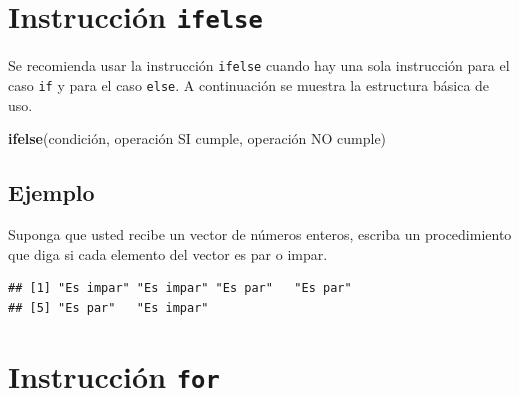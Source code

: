 \documentclass[10pt,]{krantz}
\makeatletter
\newenvironment{Shaded}{\begin{snugshade}}{\end{snugshade}}
\newcommand{\KeywordTok}[1]{\textcolor[rgb]{0.13,0.29,0.53}{\textbf{#1}}}
\newcommand{\DecValTok}[1]{\textcolor[rgb]{0.00,0.00,0.81}{#1}}
\newcommand{\StringTok}[1]{\textcolor[rgb]{0.31,0.60,0.02}{#1}}
\newcommand{\OperatorTok}[1]{\textcolor[rgb]{0.81,0.36,0.00}{\textbf{#1}}}
\newcommand{\NormalTok}[1]{#1}
\newenvironment{kframe}{%
\medskip{}
\setlength{\fboxsep}{.8em}
 \def\at@end@of@kframe{}%
 \ifinner\ifhmode%
  \def\at@end@of@kframe{\end{minipage}}%
  \begin{minipage}{\columnwidth}%
 \fi\fi%
 \def\FrameCommand##1{\hskip\@totalleftmargin \hskip-\fboxsep
 \colorbox{shadecolor}{##1}\hskip-\fboxsep
     \hskip-\linewidth \hskip-\@totalleftmargin \hskip\columnwidth}%
 \MakeFramed {\advance\hsize-\width
   \@totalleftmargin\z@ \linewidth\hsize
   \@setminipage}}%
 {\par\unskip\endMakeFramed%
 \at@end@of@kframe}
\renewenvironment{Shaded}{\begin{kframe}}{\end{kframe}}
\makeatother
\begin{document}
\section{\texorpdfstring{Instrucción \texttt{ifelse}
}{Instrucción ifelse }}\label{instruccion-ifelse}

Se recomienda usar la instrucción \texttt{ifelse} cuando hay una sola
instrucción para el caso \texttt{if} y para el caso \texttt{else}. A
continuación se muestra la estructura básica de uso.

\begin{Shaded}
\begin{Highlighting}[]
\KeywordTok{ifelse}\NormalTok{(condición, operación SI cumple, operación NO cumple)}
\end{Highlighting}
\end{Shaded}

\subsection*{Ejemplo}\label{ejemplo-16}


Suponga que usted recibe un vector de números enteros, escriba un
procedimiento que diga si cada elemento del vector es par o impar.

\begin{Shaded}
\end{Shaded}

\begin{verbatim}
## [1] "Es impar" "Es impar" "Es par"   "Es par"  
## [5] "Es par"   "Es impar"
\end{verbatim}

\section{\texorpdfstring{Instrucción \texttt{for}
}{Instrucción for }}\label{instruccion-for}
\end{document}
